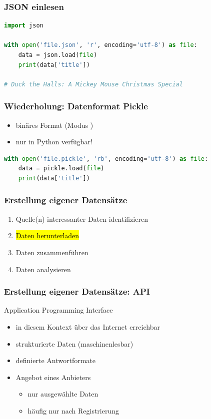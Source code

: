 \begin{frame}[fragile]
	\frametitle{JSON einlesen}

	\begin{lstlisting}[language=Python]
import json

with open('file.json', 'r', encoding='utf-8') as file:
    data = json.load(file)
    print(data['title'])

# Duck the Halls: A Mickey Mouse Christmas Special\end{lstlisting}
\end{frame}

\begin{frame}[fragile]
	\frametitle{Wiederholung: Datenformat Pickle}
	
	\begin{itemize}
		\item \alert{binäres} Format (Modus )
		\item nur in Python verfügbar!
	\end{itemize}

	\begin{lstlisting}[language=Python]
with open('file.pickle', 'rb', encoding='utf-8') as file:
    data = pickle.load(file)
    print(data['title'])\end{lstlisting}
\end{frame}

\begin{frame}
	\frametitle{Erstellung eigener Datensätze}

	\begin{enumerate}
		\item Quelle(n) interessanter Daten identifizieren
		\item \hl{Daten herunterladen}
		\item Daten zusammenführen
		\item Daten analysieren
	\end{enumerate}
\end{frame}

\begin{frame}
	\frametitle{Erstellung eigener Datensätze: API}
	
	\alert{A}pplication \alert{P}rogramming \alert{I}nterface

	\begin{itemize}
		\item in diesem Kontext über das Internet erreichbar
		\item strukturierte Daten (maschinenlesbar)
		\item definierte Antwortformate
		\item Angebot eines Anbieters
		\begin{itemize}
			\item nur ausgewählte Daten
			\item häufig nur nach Registrierung
		\end{itemize}
	\end{itemize}
\end{frame}

